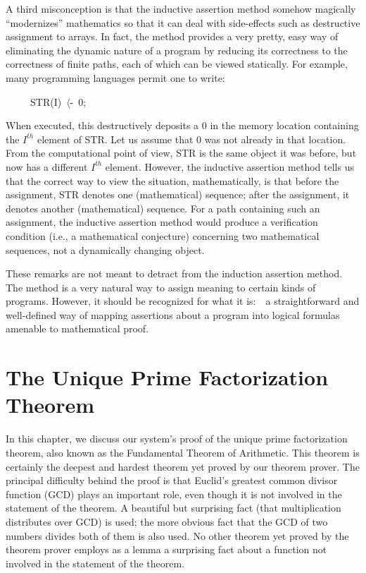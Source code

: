 \documentclass[11pt]{book}
\newenvironment{pubasis}{\begin{flushleft}\ttfamily\small}{\normalsize\rmfamily\end{flushleft}}
\newcommand{\pubdefaulttextsize}{\large}
\begin{document}
A third misconception is that the inductive assertion method somehow
magically ``modernizes'' mathematics so that it can deal with side-effects
such as destructive assignment to arrays.  In fact,
the method provides a very pretty, easy way of eliminating the dynamic
nature of a program by reducing its correctness to the correctness
of finite paths, each of which can be viewed statically.
For example, many programming languages permit one to write:
\begin{pubasis}
~~~~~STR(I)~$\langle$-~0;\\
\end{pubasis}
When executed, this destructively deposits a 0 in the memory location containing the
$I^{th}$ element of STR.  Let us assume that 0 was not already in
that location.  From the computational point of view, STR is
the same object it was before, but now has a different $I^{th}$ element.
However, the inductive assertion method tells us that the correct
way to view the situation, mathematically, is that before the
assignment, STR denotes one (mathematical) sequence; after the assignment, it
denotes another (mathematical) sequence.  For a path containing
such an assignment, the inductive assertion method would produce
a verification condition (i.e., a mathematical conjecture)
concerning two mathematical sequences, not a dynamically changing object.

These remarks are not meant to detract from the induction assertion
method.  The method is a very natural way to assign meaning to certain kinds
of programs.
However, it should be recognized for what it is:~~a straightforward
and well-defined way of mapping
assertions about a program into logical formulas amenable to mathematical
proof.
\chapter{The Unique Prime Factorization Theorem}
\label{SECPRIMEFACTORIZATION}
\pubdefaulttextsize
In this chapter, we discuss our system's  proof of the unique
prime factorization theorem, also known as the Fundamental Theorem of
Arithmetic.
This theorem is certainly the deepest and
hardest theorem yet proved by our theorem prover.  The
principal difficulty behind the proof is that Euclid's greatest common divisor
function (GCD)
plays an important role, even
though it is not involved in the statement of the theorem.
A beautiful but surprising fact (that
multiplication distributes over GCD) is used;  the more obvious
fact that the GCD of two numbers divides both
of them is also used.
No other theorem yet proved by the theorem prover employs as a lemma
a surprising fact about a function not involved in the statement of
the theorem.
\end{document}

